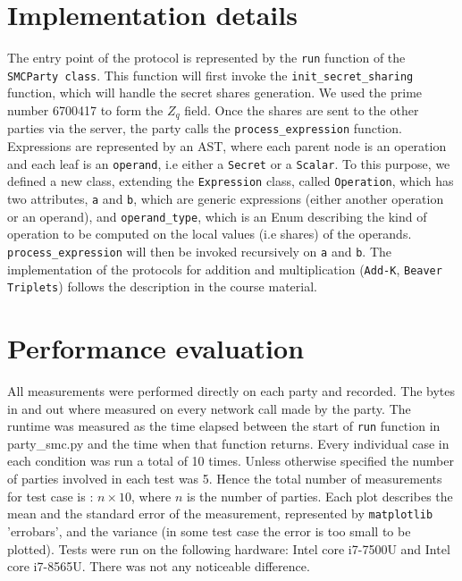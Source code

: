 \documentclass[10pt,conference,compsocconf]{IEEEtran}
\begin{document}
\section{Implementation details}
The entry point of the protocol is represented by the \texttt{run} function of the \texttt{SMCParty class}.
This function will first invoke the \texttt{init\_secret\_sharing} function, which will handle the secret shares generation.
We used the prime number 6700417 to form the $Z_q$ field.
Once the shares are sent to the other parties via the server, the party calls the \texttt{process\_expression} function.
Expressions are represented by an AST, where each parent node is an operation and each leaf is an \texttt{operand}, i.e either a \texttt{Secret} or a \texttt{Scalar}.
To this purpose, we defined a new class, extending the \texttt{Expression} class, called \texttt{Operation}, which has two attributes, \texttt{a} and \texttt{b},
which are generic expressions (either another operation or an operand), and \texttt{operand\_type}, which is an Enum describing the kind of operation to be computed on the local values (i.e shares)
of the operands. \texttt{process\_expression} will then be invoked recursively on \texttt{a} and \texttt{b}.
The implementation of the protocols for addition and multiplication (\texttt{Add-K}, \texttt{Beaver Triplets}) follows the description in the course material.

\section{Performance evaluation}
All measurements were performed directly on each party and recorded.
The bytes in and out where measured on every
network call made by the party.
The runtime was measured as the time elapsed between the start of \texttt{run} function in
party\_smc.py and the time when that function returns.
Every individual case in each condition was run a total of 10 times.
Unless otherwise specified the number of parties involved in each test was 5.
Hence the total number of measurements for test case is : $n \times 10$, where $n$ is the number of parties.
Each plot describes the mean and the standard error of the measurement, represented by \texttt{matplotlib} 'errobars', and the variance (in some test case the error is too small to be plotted).
Tests were run on the following hardware: Intel core i7-7500U and Intel core i7-8565U. There was not any noticeable difference.
\end{document}
